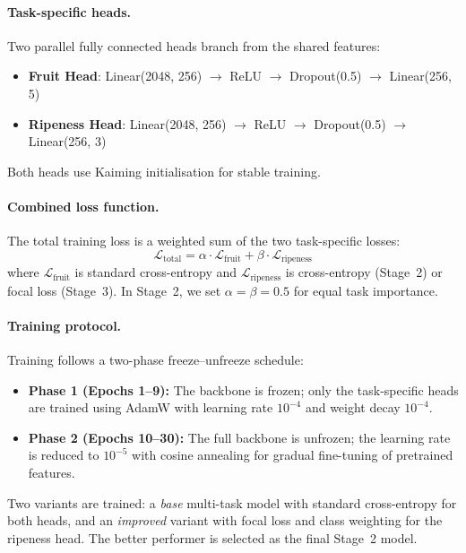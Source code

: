 \documentclass[10pt,twocolumn,letterpaper]{article}
\begin{document}
\paragraph{Task-specific heads.}
Two parallel fully connected heads branch from the shared features:
\begin{itemize}
  \item \textbf{Fruit Head}: Linear(2048, 256) $\rightarrow$ ReLU $\rightarrow$ Dropout(0.5) $\rightarrow$ Linear(256, 5)
  \item \textbf{Ripeness Head}: Linear(2048, 256) $\rightarrow$ ReLU $\rightarrow$ Dropout(0.5) $\rightarrow$ Linear(256, 3)
\end{itemize}
Both heads use Kaiming initialisation for stable training.

\paragraph{Combined loss function.}
The total training loss is a weighted sum of the two task-specific losses:
\begin{equation}
  \mathcal{L}_{\text{total}} = \alpha \cdot \mathcal{L}_{\text{fruit}} + \beta \cdot \mathcal{L}_{\text{ripeness}}
  \label{eq:combined_loss}
\end{equation}
where $\mathcal{L}_{\text{fruit}}$ is standard cross-entropy and $\mathcal{L}_{\text{ripeness}}$ is cross-entropy (Stage~2) or focal loss (Stage~3).
In Stage~2, we set $\alpha = \beta = 0.5$ for equal task importance.

\paragraph{Training protocol.}
Training follows a two-phase freeze--unfreeze schedule:
\begin{itemize}
  \item \textbf{Phase 1 (Epochs 1--9):} The backbone is frozen; only the task-specific heads are trained using AdamW with learning rate $10^{-4}$ and weight decay $10^{-4}$.
  \item \textbf{Phase 2 (Epochs 10--30):} The full backbone is unfrozen; the learning rate is reduced to $10^{-5}$ with cosine annealing for gradual fine-tuning of pretrained features.
\end{itemize}

Two variants are trained: a \emph{base} multi-task model with standard cross-entropy for both heads, and an \emph{improved} variant with focal loss and class weighting for the ripeness head.
The better performer is selected as the final Stage~2 model.
\end{document}
